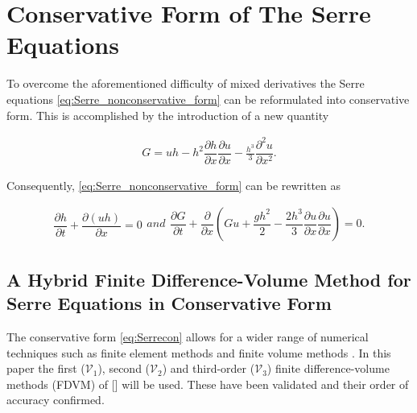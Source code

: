 \documentclass[SingleSpace,12pt,Journal]{Serre_ASCE}
\begin{document}
\section{Conservative Form of The Serre Equations}
To overcome the aforementioned difficulty of mixed derivatives the Serre equations \eqref{eq:Serre_nonconservative_form} can be reformulated into conservative form. This is accomplished by the introduction of a new quantity \cite{Hank-etal-2010-2034,Zoppou-2014}
\begin{linenomath*}
\begin{gather}
\label{eq:Gdefinition}
G = uh - h^2 \dfrac{\partial h}{\partial x} \dfrac{\partial u}{\partial x} - \frac{h^3}{3} \dfrac{\partial^2 u}{\partial x^2}.
\end{gather}
\end{linenomath*}
Consequently, \eqref{eq:Serre_nonconservative_form} can be rewritten as
\begin{linenomath*}
\begin{subequations}
\begin{gather}
\dfrac{\partial h}{\partial t} + \dfrac{\partial (uh)}{\partial x} = 0
\label{eq:Serrecon_continuity}
\end{gather}
and
\begin{gather}
\dfrac{\partial G}{\partial t} + \dfrac{\partial}{\partial x}\left(Gu + \dfrac{gh^2}{2} - \dfrac{2h^3}{3}\dfrac{\partial u}{\partial x}\dfrac{\partial u}{\partial x}\right) = 0.
\label{eq:Serrecon_momentum}
\end{gather}
\label{eq:Serrecon}
\end{subequations}
\end{linenomath*}

\subsection{A Hybrid Finite Difference-Volume Method for Serre Equations in Conservative Form}
\label{section:hybridmethod}
The conservative form \eqref{eq:Serrecon} allows for a wider range of numerical techniques such as finite element methods \cite{Guyenne-etal-2014-169} and finite volume methods \cite{Hank-etal-2010-2034,Zoppou-2014}. In this paper the first ($\mathcal{V}_1$), second ($\mathcal{V}_2$) and third-order ($\mathcal{V}_3$) finite difference-volume methods (FDVM) of [] will be used. These have been validated and their order of accuracy confirmed.
\end{document}
